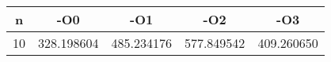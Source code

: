 \begin{center}
	\begin{tabular}{|c|c|c|c|c|}
		\hline
		 n & -O0 & -O1 & -O2 & -O3\\
		\hline
		 10 & 328.198604 & 485.234176 & 577.849542 & 409.260650\\
		\hline
	\end{tabular}
\end{center}